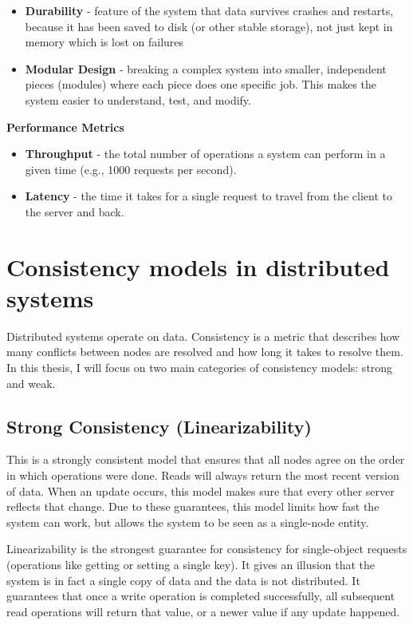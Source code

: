 \documentclass[shortabstract]{iithesis}
\begin{document}
\begin{itemize}
    \item \textbf{Durability} \label{def:durability} - feature of the system that data survives crashes and restarts,  because it has been saved to disk (or other stable storage), not just kept in memory which is lost on failures
    \item \textbf{Modular Design} \label{def:modular} - breaking a complex system into smaller, independent pieces (modules) where each piece does one specific job. This makes the system easier to understand, test, and modify.
\end{itemize}

\textbf{Performance Metrics}
\begin{itemize}
    \item \textbf{Throughput} \label{def:throughput} - the total number of operations a system can perform in a given time (e.g., 1000 requests per second).
    \item \textbf{Latency} \label{def:latency} - the time it takes for a single request to travel from the client to the server and back.
\end{itemize}

\section{Consistency models in distributed systems}

Distributed systems operate on data. Consistency is a metric that describes how many conflicts between nodes are resolved and how long it takes to resolve them. In this thesis, I will focus on two main categories of consistency models: strong and weak. 

\subsection{Strong Consistency (Linearizability)} \label{subsec:strong_consistency}
This is a strongly consistent model that ensures that all nodes agree on the order in which operations were done. Reads will always return the most recent version of data. When an update occurs, this model makes sure that every other server reflects that change. Due to these guarantees, this model limits how fast the system can work, but allows the system to be seen as a single-node entity.

Linearizability is the strongest guarantee for consistency for single-object requests (operations like getting or setting a single key). It gives an illusion that the system is in fact a single copy of data and the data is not distributed. It guarantees that once a write operation is completed successfully, all subsequent read operations will return that value, or a newer value if any update happened.
\end{document}
